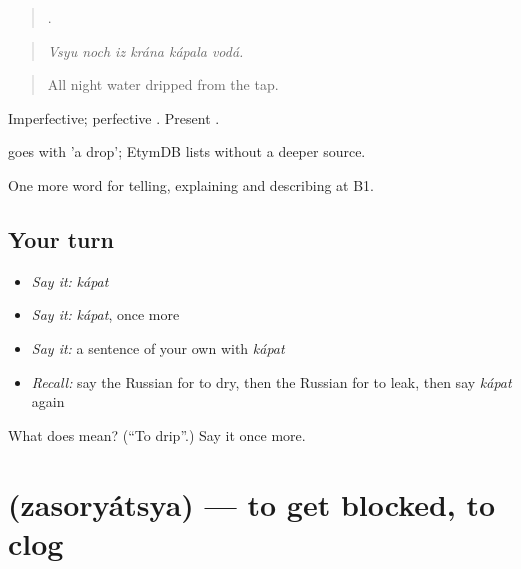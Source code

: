 \begin{quote}
     .
\end{quote}

\begin{quote}
\emph{Vsyu noch iz krána kápala vodá.}
\end{quote}

\begin{quote}
All night water dripped from the tap.
\end{quote}

Imperfective; perfective \emph{}. Present \emph{}.

\begin{cousinweb}
\emph{} goes with \emph{} 'a drop'; EtymDB lists \emph{} without a deeper source.
\end{cousinweb}

\begin{grammarlens}[title={What you've built}]
One more word for telling, explaining and describing at B1.
\end{grammarlens}

\subsection*{Your turn}
\begin{itemize}
\raggedright
  \item \emph{Say it:} \emph{kápat}
  \item \emph{Say it:} \emph{kápat}, once more
  \item \emph{Say it:} a sentence of your own with \emph{kápat}
  \item \emph{Recall:} say the Russian for to dry, then the Russian for to leak, then say \emph{kápat} again
\end{itemize}

\begin{tcolorbox}[breakable,colback=teal!4,colframe=teal!35!black,title={Before you move on}]
What does  mean? (\textquotedblleft{}To drip\textquotedblright{}.) Say it once more.
\end{tcolorbox}
\section[\texorpdfstring{\ru{засоряться} (zasoryátsya)}{засоряться (zasoryátsya)}]{ (zasoryátsya) — to get blocked, to clog}

